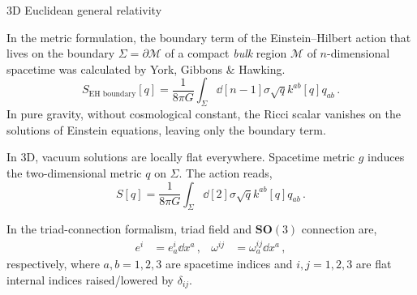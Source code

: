 \documentclass{beamer}
\newcommand\italictext[1]{\textcolor{italics}{\textit{#1}}}
\begin{document}
\begin{frame}{3D Euclidean general relativity}
    \begin{list}{\maltese}{\leftmargin=1em \itemindent=0em}
        \item<1-> In the metric formulation, the boundary term of the Einstein–Hilbert action that lives on the boundary $\Sigma=\partial\mathcal{M}$ of a compact \italictext{bulk} region $\mathcal{M}$ of $n$-dimensional spacetime was calculated by York, Gibbons \& Hawking.
        \begin{equation}
            S_{\text{EH boundary}}[q]=\frac{1}{8\pi G}\int_\Sigma\dd[n-1]{\sigma}\sqrt{q}k^{ab}[q]q_{ab}\,.
        \end{equation}
        In pure gravity, without cosmological constant, the Ricci scalar vanishes on the solutions of Einstein equations, leaving only the boundary term.
        \item<2-> In 3D, vacuum solutions are locally flat everywhere. Spacetime metric $g$ induces the two-dimensional metric $q$ on $\Sigma$. The action reads,
        \begin{equation}
            S[q]=\frac{1}{8\pi G}\int_\Sigma\dd[2]{\sigma}\sqrt{q} k^{ab}[q] q_{ab}\,.
        \end{equation}
        \item<3-> In the triad-connection formalism, triad field and $\mathbf{SO}(3)$ connection are,
        \begin{align}
            e^i&=e^i_a\dd{x^a}\,, &\omega^{ij}&=\omega^{ij}_a\dd{x^a}\,,
        \end{align}
        respectively, where $a,b=1,2,3$ are spacetime indices and $i,j=1,2,3$ are flat internal indices raised/lowered by $\delta_{ij}$.
    \end{list}
\end{frame}
\end{document}

